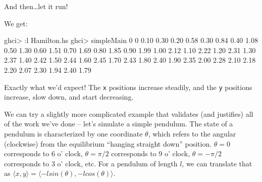\documentclass[]{article}
\newenvironment{Shaded}{}{}
\newcommand{\CommentTok}[1]{\textcolor[rgb]{0.38,0.63,0.69}{\textit{#1}}}
\newcommand{\DataTypeTok}[1]{\textcolor[rgb]{0.56,0.13,0.00}{#1}}
\newcommand{\DecValTok}[1]{\textcolor[rgb]{0.25,0.63,0.44}{#1}}
\newcommand{\FloatTok}[1]{\textcolor[rgb]{0.25,0.63,0.44}{#1}}
\newcommand{\FunctionTok}[1]{\textcolor[rgb]{0.02,0.16,0.49}{#1}}
\newcommand{\NormalTok}[1]{#1}
\newcommand{\OperatorTok}[1]{\textcolor[rgb]{0.40,0.40,0.40}{#1}}
\newcommand{\OtherTok}[1]{\textcolor[rgb]{0.00,0.44,0.13}{#1}}
\begin{document}
And then\ldots let it run!

\begin{Shaded}
\end{Shaded}

We get:

\begin{Shaded}
\begin{Highlighting}[]
\NormalTok{ghci}\OperatorTok{\textgreater{}} \OperatorTok{:}\NormalTok{l Hamilton.hs}
\NormalTok{ghci}\OperatorTok{\textgreater{}}\NormalTok{ simpleMain}
\DecValTok{0}     \DecValTok{0}
\FloatTok{0.10}  \FloatTok{0.30}
\FloatTok{0.20}  \FloatTok{0.58}
\FloatTok{0.30}  \FloatTok{0.84}
\FloatTok{0.40}  \FloatTok{1.08}
\FloatTok{0.50}  \FloatTok{1.30}
\FloatTok{0.60}  \FloatTok{1.51}
\FloatTok{0.70}  \FloatTok{1.69}
\FloatTok{0.80}  \FloatTok{1.85}
\FloatTok{0.90}  \FloatTok{1.99}
\FloatTok{1.00}  \FloatTok{2.12}
\FloatTok{1.10}  \FloatTok{2.22}
\FloatTok{1.20}  \FloatTok{2.31}
\FloatTok{1.30}  \FloatTok{2.37}
\FloatTok{1.40}  \FloatTok{2.42}
\FloatTok{1.50}  \FloatTok{2.44}
\FloatTok{1.60}  \FloatTok{2.45}
\FloatTok{1.70}  \FloatTok{2.43}
\FloatTok{1.80}  \FloatTok{2.40}
\FloatTok{1.90}  \FloatTok{2.35}
\FloatTok{2.00}  \FloatTok{2.28}
\FloatTok{2.10}  \FloatTok{2.18}
\FloatTok{2.20}  \FloatTok{2.07}
\FloatTok{2.30}  \FloatTok{1.94}
\FloatTok{2.40}  \FloatTok{1.79}
\end{Highlighting}
\end{Shaded}

Exactly what we'd expect! The \texttt{x} positions increase steadily, and the
\texttt{y} positions increase, slow down, and start decreasing.

We can try a slightly more complicated example that validates (and justifies)
all of the work we've done -- let's simulate a simple pendulum. The state of a
pendulum is characterized by one coordinate \(\theta\), which refers to the
angular (clockwise) from the equilibrium ``hanging straight down'' position.
\(\theta = 0\) corresponds to 6 o' clock, \(\theta = \pi/2\) corresponds to 9 o'
clock, \(\theta = - \pi / 2\) corresponds to 3 o' clock, etc. For a pendulum of
length \(l\), we can translate that as \(\langle x, y \rangle = \langle - l
sin(\theta),
- l cos(\theta) \rangle\).
\end{document}
